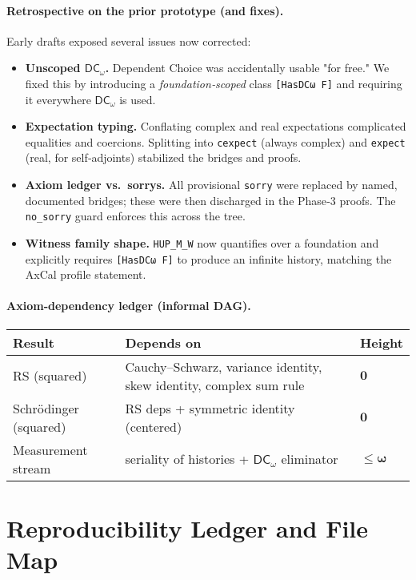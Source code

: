 \documentclass[11pt]{article}
\newcommand{\DCw}{\mathsf{DC}_{\omega}}
\newcommand{\hzero}{\mathbf{0}}
\newcommand{\homega}{\boldsymbol{\omega}}
\newcommand{\lean}[1]{\texttt{#1}}
\theoremstyle{plain}
\theoremstyle{definition}
\theoremstyle{remark}
\begin{document}
\paragraph{Retrospective on the prior prototype (and fixes).}
Early drafts exposed several issues now corrected:
\begin{itemize}
  \item \textbf{Unscoped $\DCw$.} Dependent Choice was accidentally usable "for free." We fixed this by introducing a \emph{foundation‑scoped} class \lean{[HasDCω F]} and requiring it everywhere $\DCw$ is used.
  \item \textbf{Expectation typing.} Conflating complex and real expectations complicated equalities and coercions. Splitting into \lean{cexpect} (always complex) and \lean{expect} (real, for self‑adjoints) stabilized the bridges and proofs.
  \item \textbf{Axiom ledger vs.\ sorrys.} All provisional \texttt{sorry} were replaced by named, documented bridges; these were then discharged in the Phase‑3 proofs. The \texttt{no\_sorry} guard enforces this across the tree.
  \item \textbf{Witness family shape.} \lean{HUP\_M\_W} now quantifies over a foundation and explicitly requires \lean{[HasDCω F]} to produce an infinite history, matching the AxCal profile statement.
\end{itemize}

\paragraph{Axiom‑dependency ledger (informal DAG).}
\begin{center}
\begin{tabular}{@{}lll@{}}
\toprule
\textbf{Result} & \textbf{Depends on} & \textbf{Height} \\
\midrule
RS (squared) & Cauchy--Schwarz, variance identity, skew identity, complex sum rule &
$\hzero$ \\
Schrödinger (squared) & RS deps + symmetric identity (centered) & $\hzero$ \\
Measurement stream & seriality of histories + $\DCw$ eliminator & $\le \homega$ \\
\bottomrule
\end{tabular}
\end{center}

\section{Reproducibility Ledger and File Map}
\label{sec:ledger}
\end{document}
